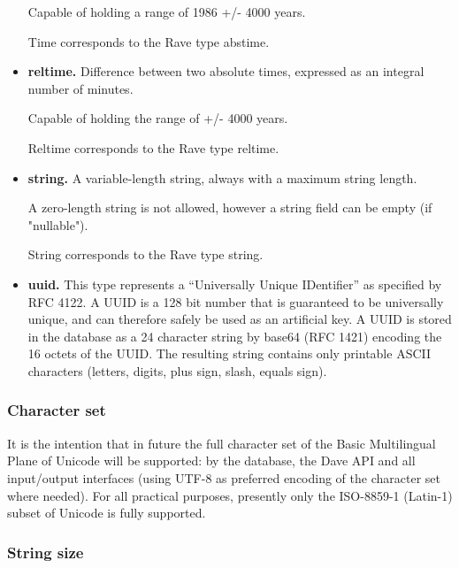 \documentclass[techdoc]{nobs}   %
\begin{document}
\begin{itemize}
Capable of holding a range of 1986 +/- 4000 years.

Time corresponds to the Rave type abstime.

\item {\bf reltime.}
\label{sec:reltime}
Difference between two absolute times, expressed as an integral number of minutes.

Capable of holding the range of +/- 4000 years.

Reltime corresponds to the Rave type reltime.

\item {\bf string.}
\label{sec:string}
A variable-length string, always with a maximum string length.

A zero-length string is not allowed, however a string field can be
empty (if "nullable").

String corresponds to the Rave type string.

\item {\bf uuid.}
\label{sec:uuid}
This type represents a ``Universally Unique IDentifier'' as specified by
RFC 4122. A UUID is a 128 bit number that is guaranteed to be universally
unique, and can therefore safely be used as an artificial key. A UUID is
stored in the database as a 24 character string by base64 (RFC 1421) encoding
the 16 octets of the UUID. The resulting string contains only printable
ASCII characters (letters, digits, plus sign, slash, equals sign).

\end{itemize}

\subsubsection{Character set}
\label{sec:Character set}

It is the intention that in future the full character set of the Basic
Multilingual Plane of Unicode will be supported: by the database, the
Dave API and all input/output interfaces (using UTF-8 as preferred
encoding of the character set where needed). For all practical
purposes, presently only the ISO-8859-1 (Latin-1) subset of
Unicode is fully supported.

\subsubsection{String size}
\label{sec:String size}
\end{document}
